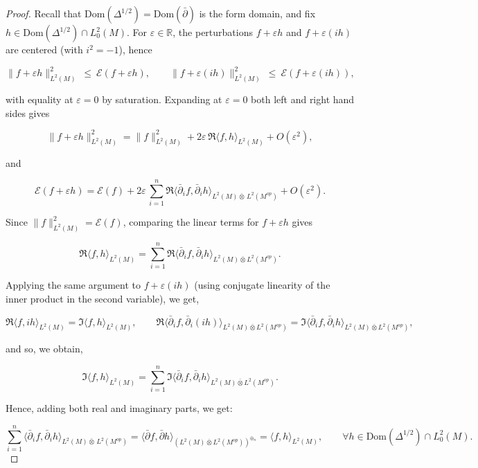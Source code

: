 \documentclass[10pt,a4paper,reqno]{amsart}
\newcommand{\Dom}{\mathrm{Dom}}
\begin{document}
\begin{proof}
Recall that $\Dom(\Delta^{1/2})=\Dom(\bar{\partial})$ is the form domain, and fix 
$h\in \Dom(\Delta^{1/2})\cap L^2_0(M)$. 
For $\varepsilon\in\mathbb{R}$, the perturbations $f+\varepsilon h$ and 
$f+\varepsilon (ih)$ are centered (with $i^2=-1$), hence


\[
\|f+\varepsilon h\|_{L^2(M)}^2\ \le\ \mathcal{E}(f+\varepsilon h),
\qquad
\|f+\varepsilon(ih)\|_{L^2(M)}^2\ \le\ \mathcal{E}(f+\varepsilon(ih)),
\]


with equality at $\varepsilon=0$ by saturation. 
Expanding at $\varepsilon=0$ both left and right hand sides gives


\[
\|f+\varepsilon h\|_{L^2(M)}^2
= \|f\|_{L^2(M)}^2 + 2\varepsilon\,\Re\langle f,h\rangle_{L^2(M)} + O(\varepsilon^2),
\]


and


\[
\mathcal{E}(f+\varepsilon h)
= \mathcal{E}(f) + 2\varepsilon\,\sum_{i=1}^n 
\Re\langle \bar{\partial}_i f,\bar{\partial}_i h\rangle_{L^2(M){\bar\otimes}\,L^2(M^{op})} 
+ O(\varepsilon^2).
\]



Since $\|f\|_{L^2(M)}^2=\mathcal{E}(f)$, comparing the linear terms for 
$f+\varepsilon h$ gives




\[
\Re\langle f,h\rangle_{L^2(M)}
=
\sum_{i=1}^n 
\Re\langle \bar{\partial}_i f,\bar{\partial}_i h\rangle_{L^2(M)\bar\otimes L^2(M^{op})}.
\]



Applying the same argument to $f+\varepsilon(ih)$ (using conjugate linearity of the inner product
in the second variable), we get,



\[
\Re\langle f,ih\rangle_{L^2(M)}
=\Im\langle f,h\rangle_{L^2(M)},
\qquad
\Re\langle \bar{\partial}_i f,\bar{\partial}_i(ih)\rangle_{L^2(M)\bar\otimes L^2(M^{op})}
=\Im\langle \bar{\partial}_i f,\bar{\partial}_i h\rangle_{L^2(M)\bar\otimes L^2(M^{op})},
\]



and so, we obtain,



\[
\Im\langle f,h\rangle_{L^2(M)}
=
\sum_{i=1}^n 
\Im\langle \bar{\partial}_i f,\bar{\partial}_i h\rangle_{L^2(M)\bar\otimes L^2(M^{op})}.
\]




Hence, adding both real and imaginary parts, we get:


\[
\sum_{i=1}^n \langle \bar{\partial}_i f,\bar{\partial}_i h\rangle_{L^2(M){\bar\otimes}\,L^2(M^{op})}
=\langle \bar\partial f,\bar\partial h\rangle_{(L^2(M)\bar\otimes L^2(M^{op}))^{\oplus_n}}
=\langle f,h\rangle_{L^2(M)},
\qquad 
\forall h\in \Dom(\Delta^{1/2})\cap L^2_0(M).
\]




\end{proof}
\end{document}
